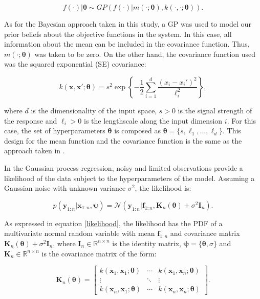 \documentclass{article}
\begin{document}
\begin{equation}
    f(\cdot)|\boldsymbol{\theta} \sim GP(f(\cdot)|m(\cdot;\boldsymbol{\theta}),k(\cdot,\cdot;\boldsymbol{\theta})).
\end{equation}

As for the Bayesian approach taken in this study, a GP was used to model our prior beliefs about the objective functions in the system. In this case, all information about the mean can be included in the covariance function. Thus, $m(\cdot;\boldsymbol{\theta})$ was taken to be zero. On the other hand, the covariance function used was the squared exponential (SE) covariance:

\begin{equation}
    k(\textbf{x},\textbf{x}';\boldsymbol{\theta}) = s^2 \exp \left \{ -\frac{1}{2}\sum_{i=1}^{d}\frac{(x_i - x_i')^2}{\ell_i^2} \right \},
\end{equation}

where $d$ is the dimensionality of the input space, $s > 0$ is the signal strength of the response and $\ell_i > 0$ is the lengthscale along the input dimension $i$. For this case, the set of hyperparameters $\boldsymbol{\theta}$ is composed as $\boldsymbol{\theta} = \{s, \ell_1, \ldots, \ell_d\}$. This design for the mean function and the covariance function is the same as the approach taken in \cite{Pandita2016}.

In the Gaussian process regression, noisy and limited observations provide a likelihood of the data subject to the hyperparameters of the model. Assuming a Gaussian noise with unknown variance $\sigma^2$, the likelihood is\cite{Pandita2016}:

\begin{equation}
    p(\textbf{y}_{1:n}|\textbf{x}_{1:n}, \boldsymbol{\psi}) = \mathcal{N}(\textbf{y}_{1:n}|\textbf{f}_{1:n},\textbf{K}_n(\boldsymbol{\theta}) + \sigma^2\textbf{I}_n).
    \label{likelihood}
\end{equation}

As expressed in equation \ref{likelihood}, the likelihood has the PDF of a multivariate normal random variable with mean $\textbf{f}_{1:n}$ and covariance matrix $\textbf{K}_n(\boldsymbol{\theta}) + \sigma^2\textbf{I}_n$, where $\textbf{I}_n \in \mathbb{R}^{n\times n}$ is the identity matrix, $\boldsymbol{\psi} = \{ \boldsymbol{\theta}, \sigma \} $ and $\textbf{K}_n \in \mathbb{R}^{n\times n}$ is the covariance matrix of the form:

\begin{equation}
    \textbf{K}_n(\boldsymbol{\theta}) =
    \begin{bmatrix}
        k(\textbf{x}_1,\textbf{x}_1;\boldsymbol{\theta}) & \cdots & k(\textbf{x}_1,\textbf{x}_n;\boldsymbol{\theta}) \\
        \vdots & \ddots & \vdots\\
        k(\textbf{x}_n,\textbf{x}_1;\boldsymbol{\theta}) & \cdots & k(\textbf{x}_n,\textbf{x}_n;\boldsymbol{\theta})
    \end{bmatrix}.
\end{equation}
\end{document}
